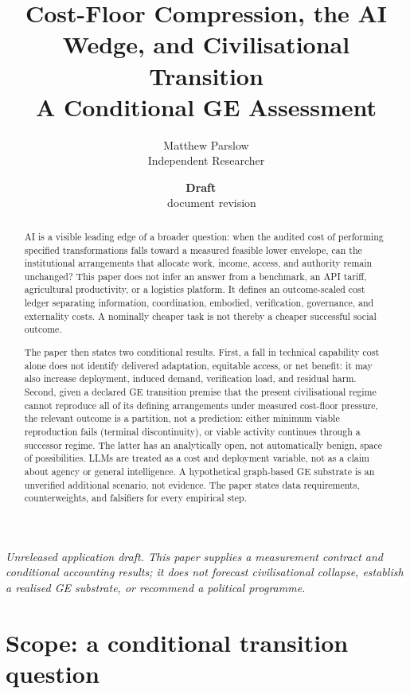 \documentclass[11pt]{article}
\title{Cost-Floor Compression, the AI Wedge, and Civilisational Transition\\\large A Conditional GE Assessment}
\author{Matthew Parslow\\Independent Researcher}
\date{\textbf{Draft \texorpdfstring{\textemdash}{---}\ \PaperDraft}\\[2pt]\PaperDisplayDate\ \texorpdfstring{\textbullet}{\textperiodcentered}\ document revision \PaperRevision}
\begin{document}
\maketitle
\begin{center}
\textit{Unreleased application draft. This paper supplies a measurement contract and conditional accounting results; it does not forecast civilisational collapse, establish a realised GE substrate, or recommend a political programme.}
\end{center}
\vspace{1em}

\begin{abstract}
AI is a visible leading edge of a broader question: when the audited cost of
performing specified transformations falls toward a measured feasible lower
envelope, can the institutional arrangements that allocate work, income,
access, and authority remain unchanged? This paper does not infer an answer
from a benchmark, an API tariff, agricultural productivity, or a logistics
platform. It defines an outcome-scaled cost ledger separating information,
coordination, embodied, verification, governance, and externality costs. A
nominally cheaper task is not thereby a cheaper successful social outcome.

The paper then states two conditional results. First, a fall in technical
capability cost alone does not identify delivered adaptation, equitable access,
or net benefit: it may also increase deployment, induced demand, verification
load, and residual harm. Second, given a declared GE transition premise that
the present civilisational regime cannot reproduce all of its defining
arrangements under measured cost-floor pressure, the relevant outcome is a
partition, not a prediction: either minimum viable reproduction fails
(terminal discontinuity), or viable activity continues through a successor
regime. The latter has an analytically open, not automatically benign, space of
possibilities. LLMs are treated as a cost and deployment variable, not as a
claim about agency or general intelligence. A hypothetical graph-based GE
substrate is an unverified additional scenario, not evidence. The paper states
data requirements, counterweights, and falsifiers for every empirical step.
\end{abstract}

\section{Scope: a conditional transition question}\label{sec:scope}
\end{document}

